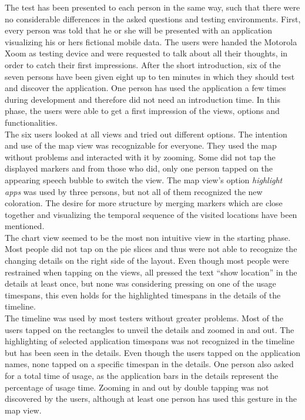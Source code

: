 The  test has been presented to each person in the same way, such that there were no considerable differences in the asked questions and testing environments. First, every person was told that he or she will be presented with an application visualizing his or hers fictional mobile data. The users were handed the Motorola Xoom as testing device and were requested to talk about all their thoughts, in order to catch their first impressions. After the short introduction, six of the seven persons have been given eight up to ten minutes in which they should test and discover the application. One person has used the application a few times during development and therefore did not need an introduction time. In this phase, the users were able to get a first impression of the views, options and functionalities.\\
The  six users looked at all views and tried out different options. The intention and use of the map view was recognizable for everyone. They used the map without problems and interacted with it by zooming. Some did not tap the displayed markers and from those who did, only one person tapped on the appearing speech bubble to switch the view. The map view's option \emph{highlight apps} was used by three persons, but not all of them recognized the new coloration. The desire for more structure by merging markers which are close together and visualizing the temporal sequence of the visited locations have been mentioned.\\
The  chart view seemed to be the most non intuitive view in the starting phase. Most people did not tap on the pie slices and thus were not able to recognize the changing details on the right side of the layout. Even though most people were restrained when tapping on the views, all pressed the text ``show location'' in the details at least once, but none was considering pressing on one of the usage timespans, this even holds for the highlighted timespans in the details of the timeline.\\
The  timeline was used by most testers without greater problems. Most of the users tapped on the rectangles to unveil the details and zoomed in and out. The highlighting of selected application timespans was not recognized in the timeline but has been seen in the details. Even though the users tapped on the application names, none tapped on a specific timespan in the details. One person also asked for a total time of usage, as the application bars in the details represent the percentage of usage time. Zooming in and out by double tapping was not discovered by the users, although at least one person has used this gesture in the map view.\\
